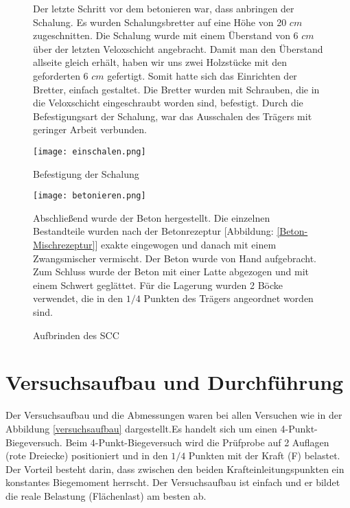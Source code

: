 \documentclass[12 pt,a4 paper ]{scrreprt}
\begin{document}
\begin{figure}[h!]
\begin{minipage}[h]{7cm}	
	Der letzte Schritt vor dem betonieren war, dass anbringen der Schalung. Es wurden Schalungsbretter auf eine Höhe von 20 $cm$ zugeschnitten. Die Schalung wurde mit einem Überstand von 6 $cm$ über der letzten Veloxschicht angebracht. Damit man den Überstand allseite gleich erhält, haben wir uns zwei Holzstücke mit den geforderten 6 $cm$ gefertigt. Somit hatte sich das Einrichten der Bretter, einfach gestaltet.  Die Bretter wurden mit Schrauben, die in die Veloxschicht eingeschraubt worden sind, befestigt. Durch die Befestigungsart der Schalung, war das Ausschalen des Trägers mit geringer Arbeit verbunden.

\end{minipage}
\hfill
\begin{minipage}[h]{7cm}
	\texttt{[image: einschalen.png]}
	\caption{Befestigung der Schalung}
	\label{einschalen}
\end{minipage}
\end{figure}


\begin{figure}[h!]
\begin{minipage}[h]{7cm}
	\texttt{[image: betonieren.png]}
	\caption{Aufbrinden des SCC}
	\label{betonieren}
\end{minipage}
\hfill
\begin{minipage}[h]{7cm}
Abschließend wurde der Beton hergestellt. Die einzelnen Bestandteile wurden nach der Betonrezeptur [Abbildung: \ref{Beton-Mischrezeptur}] exakte eingewogen und danach mit einem Zwangsmischer vermischt. Der Beton wurde von Hand aufgebracht. Zum Schluss wurde der Beton mit einer Latte abgezogen und mit einem Schwert geglättet.
Für die Lagerung wurden 2 Böcke verwendet, die in den $1/4$ Punkten des Trägers angeordnet worden sind.

	
\end{minipage}
\end{figure}


\chapter{Versuchsaufbau und Durchführung}
Der Versuchsaufbau und die Abmessungen waren bei allen Versuchen wie in der Abbildung \ref{versuchsaufbau} dargestellt.Es handelt sich um einen 4-Punkt-Biegeversuch.   
Beim 4-Punkt-Biegeversuch wird die Prüfprobe auf 2 Auflagen (rote Dreiecke) positioniert und in den $1/4$  Punkten mit der Kraft (F) belastet. Der Vorteil besteht darin, dass zwischen den beiden Krafteinleitungspunkten ein konstantes Biegemoment herrscht. Der Versuchsaufbau ist einfach und er bildet die reale Belastung (Flächenlast) am besten ab. 
\end{document}

